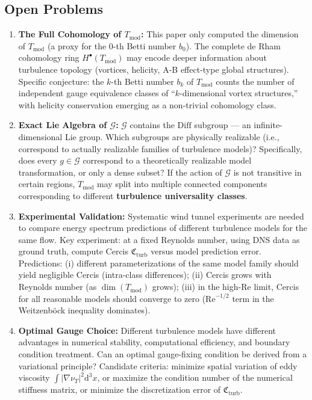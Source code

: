 \documentclass[12pt,a4paper]{article}
\theoremstyle{plain}
\theoremstyle{definition}
\theoremstyle{remark}
\newcommand{\G}{\mathcal{G}}
\newcommand{\cercis}{\mathfrak{C}}
\newcommand{\Tmod}{T_{\text{mod}}}
\newcommand{\ReNum}{\mathrm{Re}}
\newcommand{\diff}{\mathrm{d}}
\newcommand{\Grad}{\nabla}
\newcommand{\Diff}{\mathrm{Diff}}
\begin{document}
\subsection{Open Problems}

\begin{enumerate}[label=\textbf{OP\arabic*}.]
    \item \textbf{The Full Cohomology of $\Tmod$:} This paper only computed the dimension of $\Tmod$ (a proxy for the 0-th Betti number $b_0$). The complete de Rham cohomology ring $H^\bullet(\Tmod)$ may encode deeper information about turbulence topology (vortices, helicity, A-B effect-type global structures). Specific conjecture: the $k$-th Betti number $b_k$ of $\Tmod$ counts the number of independent gauge equivalence classes of ``$k$-dimensional vortex structures,'' with helicity conservation emerging as a non-trivial cohomology class.

    \item \textbf{Exact Lie Algebra of $\G$:} $\G$ contains the $\Diff$ subgroup --- an infinite-dimensional Lie group. Which subgroups are physically realizable (i.e., correspond to actually realizable families of turbulence models)? Specifically, does every $g\in\G$ correspond to a theoretically realizable model transformation, or only a dense subset? If the action of $\G$ is not transitive in certain regions, $\Tmod$ may split into multiple connected components corresponding to different \textbf{turbulence universality classes}.

    \item \textbf{Experimental Validation:} Systematic wind tunnel experiments are needed to compare energy spectrum predictions of different turbulence models for the same flow. Key experiment: at a fixed Reynolds number, using DNS data as ground truth, compute Cercis $\cercis_{\text{turb}}$ versus model prediction error. Predictions: (i) different parameterizations of the same model family should yield negligible Cercis (intra-class differences); (ii) Cercis grows with Reynolds number (as $\dim(\Tmod)$ grows); (iii) in the high-Re limit, Cercis for all reasonable models should converge to zero ($\ReNum^{-1/2}$ term in the Weitzenb\"ock inequality dominates).

    \item \textbf{Optimal Gauge Choice:} Different turbulence models have different advantages in numerical stability, computational efficiency, and boundary condition treatment. Can an optimal gauge-fixing condition be derived from a variational principle? Candidate criteria: minimize spatial variation of eddy viscosity $\int|\Grad\nu_T|^2\diff^3x$, or maximize the condition number of the numerical stiffness matrix, or minimize the discretization error of $\cercis_{\text{turb}}$.


\end{enumerate}
\end{document}
